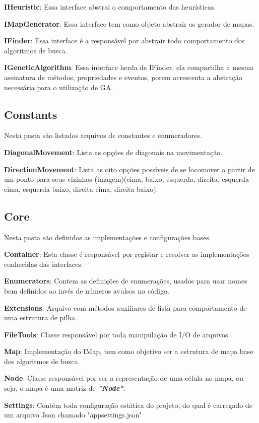 \textbf{IHeuristic}: Essa interface abstrai o comportamento das heurísticas.

\textbf{IMapGenerator}: Essa interface tem como objeto abstrair os gerador de mapas.

\textbf{IFinder}: Essa interface é a responsável por abstrair todo comportamento dos algoritmos de busca.

\textbf{IGeneticAlgorithm}: Essa interface herda de IFinder, ela compartilha a mesma assinatura de métodos, propriedades e eventos, porem acrescenta a abstração necessária para
o utilização de GA.

\subsection{Constants}

Nesta pasta são listados arquivos de constantes e enumeradores.

\textbf{DiagonalMovement}: Lista as opções de diagonais na movimentação.

\textbf{DirectionMovement}: Lista as oito opções possíveis de se locomover a partir de um ponto para seus vizinhos 
(imagem)(cima, baixo, esquerda, direita, esquerda cima, esquerda baixo, direita cima, direita baixo).

\subsection{Core}

Nesta pasta são definidos as implementações e configurações bases.

\textbf{Container}: Esta classe é responsável por registar e resolver as implementações conhecidas das interfaces.

\textbf{Enumerators}: Contem as definições de enumerações, usados para usar nomes bem definidos ao invés de números avulsos no código.

\textbf{Extensions}: Arquivo com métodos auxiliares de lista para comportamento de uma estrutura de pilha.

\textbf{FileTools}: Classe responsável por toda manipulação de I/O de arquivos

\textbf{Map}: Implementação do IMap, tem como objetivo ser a estrutura de mapa base dos algoritmos de busca.

\textbf{Node}: Classe responsável por ser a representação de uma célula no mapa, ou seja, o mapa é uma matriz de \textbf{\textit{"Node"}}.

\textbf{Settings}: Contém toda configuração estática do projeto, do qual é carregado de um arquivo Json chamado "appsettings.json"

